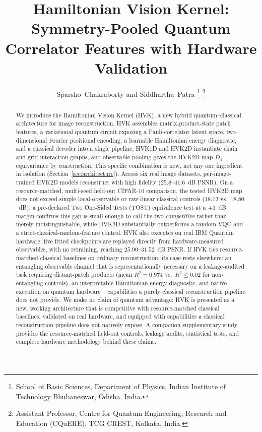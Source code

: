 \documentclass[journal]{IEEEtran}
\begin{document}
\title{Hamiltonian Vision Kernel: Symmetry-Pooled Quantum Correlator Features with Hardware Validation}

\author{Sparsho~Chakraborty and Siddhartha~Patra%
\thanks{School of Basic Sciences, Department of Physics, Indian Institute of Technology Bhubaneswar, Odisha, India.}%
\thanks{Assistant Professor, Centre for Quantum Engineering, Research and Education (CQuERE), TCG CREST, Kolkata, India.}}

\maketitle

\begin{abstract}
We introduce the Hamiltonian Vision Kernel (HVK), a new hybrid quantum--classical architecture for image reconstruction. HVK assembles matrix-product-state patch features, a variational quantum circuit exposing a Pauli-correlator latent space, two-dimensional Fourier positional encoding, a learnable Hamiltonian energy diagnostic, and a classical decoder into a single pipeline; HVK1D and HVK2D instantiate chain and grid interaction graphs, and observable pooling gives the HVK2D map $D_4$ equivariance by construction. This specific combination is new, not any one ingredient in isolation (Section~\ref{sec:architecture}). Across six real image datasets, per-image-trained HVK2D models reconstruct with high fidelity ($25.8$--$41.6$~dB PSNR). On a resource-matched, multi-seed held-out CIFAR-10 comparison, the tested HVK2D map does not exceed simple local-observable or raw-linear classical controls ($18.12$ vs.\ $18.80$~dB); a pre-declared Two One-Sided Tests (TOST) equivalence test at a $\pm1$~dB margin confirms this gap is small enough to call the two \emph{competitive} rather than merely indistinguishable, while HVK2D substantially outperforms a random-VQC and a strict-classical-random-feature control. HVK also executes on real IBM Quantum hardware: five fitted checkpoints are replayed directly from hardware-measured observables, with no retraining, reaching $25.90$--$31.52$~dB PSNR. If HVK ties resource-matched classical baselines on ordinary reconstruction, its case rests elsewhere: an entangling observable channel that is representationally necessary on a leakage-audited task requiring distant-patch products (mean $R^2=0.974$ vs.\ $R^2\leq0.02$ for non-entangling controls), an interpretable Hamiltonian energy diagnostic, and native execution on quantum hardware -- capabilities a purely classical reconstruction pipeline does not provide. We make no claim of quantum advantage: HVK is presented as a new, working architecture that is competitive with resource-matched classical baselines, validated on real hardware, and equipped with capabilities a classical reconstruction pipeline does not natively expose. A companion supplementary study provides the resource-matched held-out controls, leakage audits, statistical tests, and complete hardware methodology behind these claims.
\end{abstract}
\end{document}
